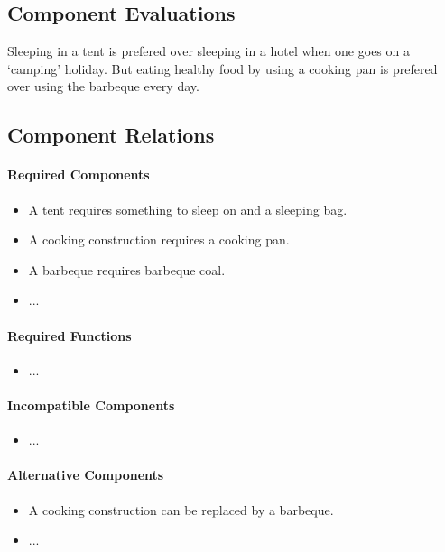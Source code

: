 \documentclass[a4paper,11pt]{article}
\begin{document}
\subsection*{Component Evaluations}

Sleeping in a tent is prefered over sleeping in a hotel
when one goes on a `camping' holiday. But eating healthy
food by using a cooking pan is prefered over using the
barbeque every day.


\subsection*{Component Relations}

\paragraph{Required Components}

\begin{itemize}
\item A tent requires something to sleep on and a
  sleeping bag.
\item A cooking construction requires a cooking pan.
\item A barbeque requires barbeque coal.
\item ...
\end{itemize}

\paragraph{Required Functions}

\begin{itemize}
\item ...
\end{itemize}

\paragraph{Incompatible Components}

\begin{itemize}
\item ...
\end{itemize}

\paragraph{Alternative Components}

\begin{itemize}
\item A cooking construction can be replaced by a barbeque.
\item ...
\end{itemize}
\end{document}
